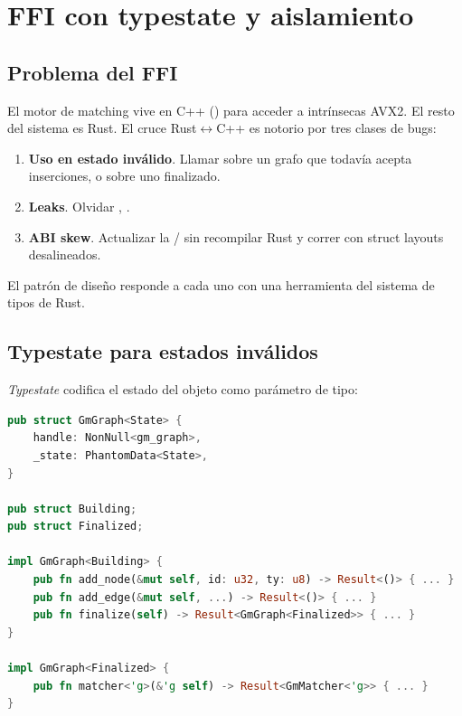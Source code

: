 \chapter{FFI con typestate y aislamiento}
\label{sec:paper-ffi}

\section{Problema del FFI}

El motor de matching vive en C++ () para
acceder a intrínsecas AVX2. El resto del sistema es Rust. El
cruce Rust$\leftrightarrow$C++ es notorio por tres clases de bugs:

\begin{enumerate}
    \item \textbf{Uso en estado inválido}. Llamar 
    sobre un grafo que todavía acepta inserciones, o 
    sobre uno finalizado.
    \item \textbf{Leaks}. Olvidar ,
    .
    \item \textbf{ABI skew}. Actualizar la /
    sin recompilar Rust y correr con struct layouts desalineados.
\end{enumerate}

El patrón de diseño responde a cada uno con una herramienta del
sistema de tipos de Rust.

\section{Typestate para estados inválidos}

\emph{Typestate} codifica el estado del objeto como parámetro de
tipo:

\begin{lstlisting}[language=Rust]
pub struct GmGraph<State> {
    handle: NonNull<gm_graph>,
    _state: PhantomData<State>,
}

pub struct Building;
pub struct Finalized;

impl GmGraph<Building> {
    pub fn add_node(&mut self, id: u32, ty: u8) -> Result<()> { ... }
    pub fn add_edge(&mut self, ...) -> Result<()> { ... }
    pub fn finalize(self) -> Result<GmGraph<Finalized>> { ... }
}

impl GmGraph<Finalized> {
    pub fn matcher<'g>(&'g self) -> Result<GmMatcher<'g>> { ... }
}
\end{lstlisting}

